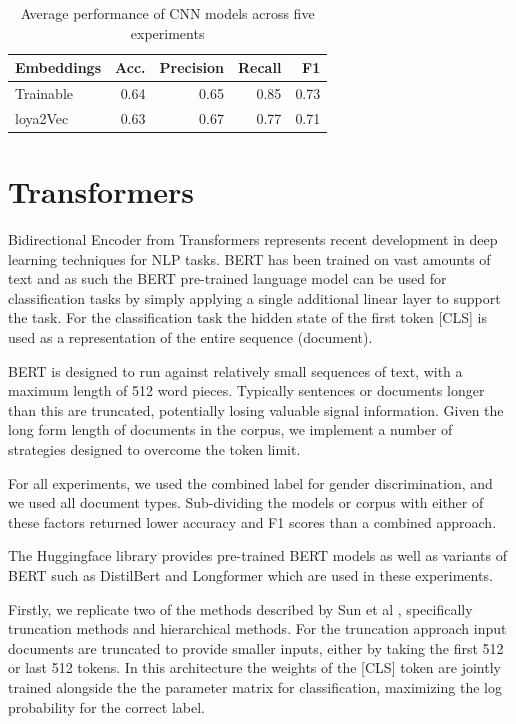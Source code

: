 \documentclass[twocolumn,10pt]{wmrDoc}
\begin{document}
\begin{table}
 \caption{Average performance of CNN models across five experiments}
  \centering
  \begin{tabular}{lrrrr}
    \toprule
    Embeddings & Acc. & Precision & Recall & F1\\
    \midrule
    Trainable & 0.64 & 0.65 & 0.85 & 0.73 \\
    loya2Vec  & 0.63 & 0.67 & 0.77 & 0.71 \\
    \bottomrule
  \end{tabular}
  \label{tab:cnn}
\end{table}

\section{Transformers}
Bidirectional Encoder from Transformers \cite{devlin} represents recent development in deep learning techniques for NLP tasks. BERT has been trained on vast amounts of text and as such the BERT pre-trained language model can be used for classification tasks by simply applying a single additional linear layer to support the task. For the classification task the hidden state of the first token [CLS] is used as a representation of the entire sequence (document). 

BERT is designed to run against relatively small sequences of text, with a maximum length of 512 word pieces. Typically sentences or documents longer than this are truncated, potentially losing valuable signal information. Given the long form length of documents in the corpus, we implement a number of strategies designed to overcome the token limit.

For all experiments, we used the combined label for gender discrimination, and we used all document types. Sub-dividing the models or corpus with either of these factors returned lower accuracy and F1 scores than a combined approach.

The Huggingface library provides pre-trained BERT models as well as  variants of BERT such as DistilBert and Longformer which are used in these experiments. 

Firstly, we replicate two of the methods described by Sun et al \cite{sun}, specifically truncation methods and hierarchical methods. For the truncation approach input documents are truncated to provide smaller inputs, either by taking the first 512 or last 512 tokens. In this architecture the weights of the [CLS] token are jointly trained alongside the the parameter matrix for classification, maximizing the log probability for the correct label.
\end{document}
